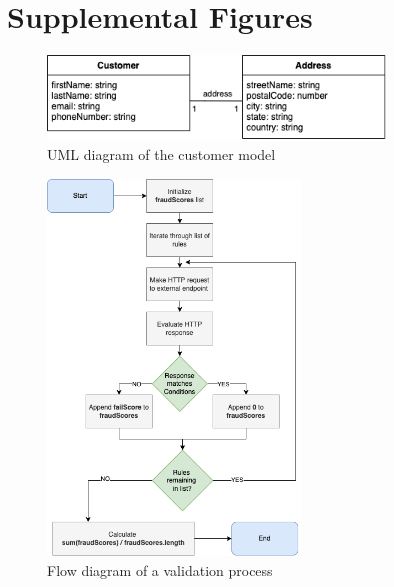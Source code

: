   \newpage
  \section{Supplemental Figures}

  \begin{figure}[!ht]
    \centering
    \includegraphics[width=0.8\textwidth]{diagrams/entity-customer.png}
    \caption{UML diagram of the customer model}
   \label{fig:customer_uml}
  \end{figure}
  
  \begin{figure}[!ht]
    \centering
    \includegraphics[width=0.6\textwidth]{diagrams/flow.png}
    \caption{Flow diagram of a validation process}
    \label{fig:flow_validation}
  \end{figure}
  
\newpage
\thispagestyle{empty}      
\noindent

\newpage
